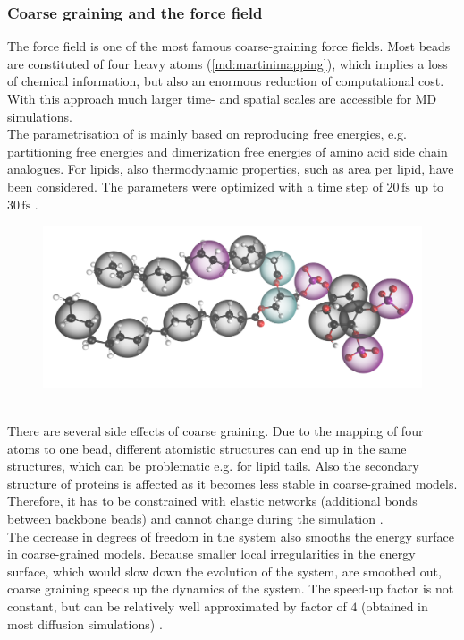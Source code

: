 \subsubsection{Coarse graining and the \martini{} force field}
\label{subsub:coarsegraining}
The \martini{} force field \autocites{martini}{martini22}{martini22_lipids} is one of the most famous coarse-graining force fields. Most beads are constituted of four heavy atoms (\autoref{md:martinimapping}), which implies a loss of chemical information, but also an enormous reduction of computational cost. With this approach much larger time- and spatial scales are accessible for MD simulations.\\
The parametrisation of \martini{} is mainly based on reproducing free energies, e.g. partitioning free energies and dimerization free energies of amino acid side chain analogues. For lipids, also thermodynamic properties, such as area per lipid, have been considered. The parameters were optimized with a time step of $20\,\si{\femto\second}$ up to $30\,\si{\femto\second}$ \autocites{martini22}{martini22_lipids}.\\
%
%
%
\begin{figure}[b]
	\centering
	\includegraphics[width=.5\textwidth]{figures/introduction/fig_martini_mapping}
	\label{md:martinimapping}
\end{figure}
%
%
%
\\
There are several side effects of coarse graining. Due to the mapping of four atoms to one bead, different atomistic structures can end up in the same \martini{} structures, which can be problematic e.g. for lipid tails. Also the secondary structure of proteins is affected as it becomes less stable in coarse-grained models. Therefore, it has to be constrained with elastic networks (additional bonds between backbone beads) and cannot change during the simulation \autocite{martini22_check}.\\
The decrease in degrees of freedom in the system also smooths the energy surface in coarse-grained models. Because smaller local irregularities in the energy surface, which would slow down the evolution of the system, are smoothed out, coarse graining speeds up the dynamics of the system. The speed-up factor is not constant, but can be relatively well approximated by factor of $4$ (obtained in most diffusion simulations) \autocites{martini22_check}{martini}.\\
